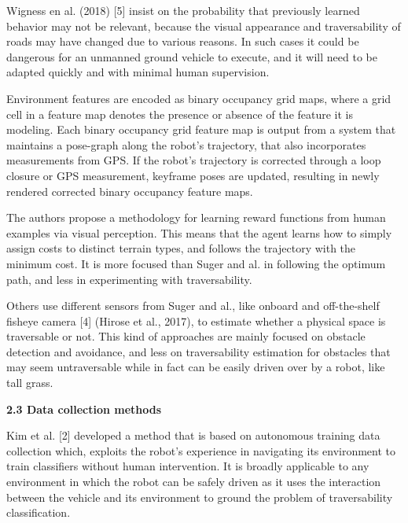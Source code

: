 \documentclass[12pt,a4paper]{report}
\begin{document}
	Wigness en al. (2018) [5] insist on the probability that previously learned 
	behavior may not be relevant, because the visual appearance and traversability 
	of roads may have changed due to various reasons. In such cases it could be 
	dangerous for an unmanned ground vehicle to execute, and it will need to be 
	adapted quickly and with minimal human supervision.
	
	Environment features are encoded as binary occupancy grid maps, where 
	a grid cell in a feature map denotes the presence or absence of the feature 
	it is modeling. Each binary occupancy grid feature map is output from a 
	system that maintains a pose-graph along the robot’s trajectory, that also 
	incorporates measurements from GPS. If the robot’s trajectory is corrected 
	through a loop closure or GPS measurement, keyframe poses are updated, 
	resulting in newly rendered corrected binary occupancy feature maps.
	
	The authors propose a methodology for learning reward functions from 
	human examples via visual perception. This means that the agent learns 
	how to simply assign costs to distinct terrain types, and follows the 
	trajectory with the minimum cost. It is more focused than Suger and al. in 
	following the optimum path, and less in experimenting with traversability.
	\newline
	
	Others use different sensors from Suger and al., like onboard and off-the-shelf 
	fisheye camera [4] (Hirose et al., 2017), to estimate whether a physical space 
	is traversable or not. This kind of approaches are mainly focused on obstacle 
	detection and avoidance, and less on traversability estimation for obstacles 
	that may seem untraversable while in fact can be easily driven over by a 
	robot, like tall grass.
	\newline\newline
	
	\large\textbf{2.3 Data collection methods}
	\normalsize\newline
	
	Kim et al. [2] developed a method 
	that is based on autonomous training data collection which, exploits the 
	robot’s experience in navigating its environment to train classifiers without 
	human intervention. It is broadly applicable to any environment in which 
	the robot can be safely driven as it uses the interaction between the vehicle
	and its environment to ground the problem of traversability classification.
	
\end{document}
